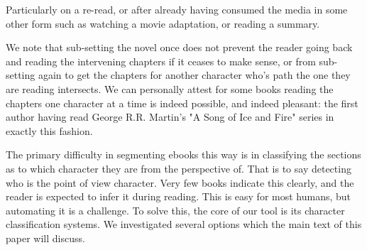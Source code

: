 \documentclass[11pt,a4paper]{article}
\begin{document}
Particularly on a re-read, or after already having consumed the media in some other form such as watching a movie adaptation, or reading a summary.

We note that sub-setting the novel once does not prevent the reader going back and reading the intervening chapters if it ceases to make sense, or from sub-setting again to get the chapters for another character who's path the one they are reading intersects.
We can personally attest for some books reading the chapters one character at a time is indeed possible, and indeed pleasant: the first author having read George R.R. Martin's "A Song of Ice and Fire" series in exactly this fashion.


The primary difficulty in segmenting ebooks this way is in classifying the sections as to which character they are from the perspective of.
That is to say detecting who is the point of view character.
Very few books indicate this clearly, and the reader is expected to infer it during reading.
This is easy for most humans, but automating it is a challenge.
To solve this, the core of our tool is its character classification systems.
We investigated several options which the main text of this paper will discuss.
\end{document}
